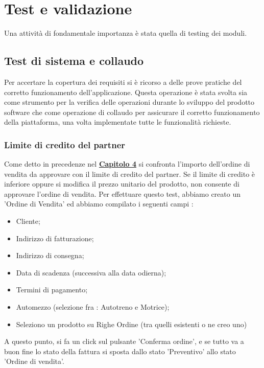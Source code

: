 
\hypertarget{(chap:capitolo5)}{}
\chapter{Test e validazione}
Una attività di fondamentale importanza è stata quella di testing dei moduli.


\section{Test di sistema e collaudo}

Per accertare la copertura dei requisiti si è ricorso a delle prove pratiche del corretto funzionamento dell’applicazione. Questa operazione è stata svolta sia come strumento per la verifica delle operazioni durante lo sviluppo del prodotto software che come operazione di collaudo per assicurare il corretto funzionamento della piattaforma, una volta implementate tutte le funzionalità richieste.

\subsection{Limite di credito del partner}

Come detto in precedenze nel \hyperlink{(chap:capitolo4)}{\textbf{Capitolo 4}} si confronta l'importo dell'ordine di vendita da approvare con il limite di credito del partner. Se il limite di credito è inferiore oppure si modifica il prezzo unitario del prodotto, non consente di approvare l'ordine di vendita.
\newpage
Per effettuare questo test, abbiamo creato un 'Ordine di Vendita' ed abbiamo compilato i seguenti campi :
\begin{itemize}
\item Cliente;
\item Indirizzo di fatturazione;
\item Indirizzo di consegna;
\item Data di scadenza (successiva alla data odierna);
\item Termini di pagamento;
\item Automezzo (selezione fra : Autotreno e Motrice);
\item Seleziono un prodotto su Righe Ordine (tra quelli esistenti o ne creo uno)
\end{itemize}

A questo punto, si fa un click sul pulsante 'Conferma ordine', e se tutto va a buon fine lo stato della fattura si sposta dallo stato 'Preventivo' allo stato 'Ordine di vendita'.


